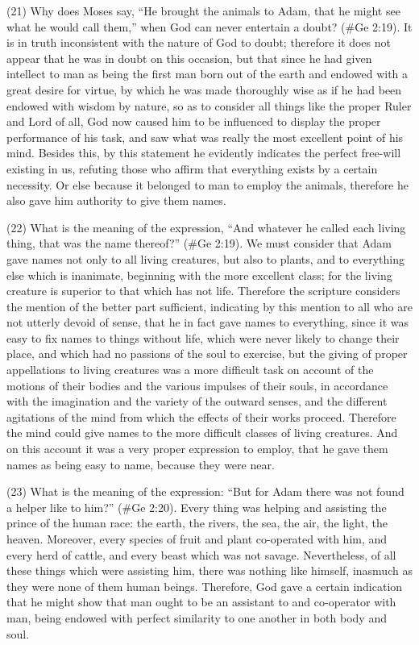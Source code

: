 (21) Why does Moses say, ``He brought the animals to Adam, that he might see what he would call
them,'' when God can never entertain a doubt? (\#Ge 2:19). It is in truth inconsistent with the
nature of God to doubt; therefore it does not appear that he was in doubt on this occasion, but that
since he had given intellect to man as being the first man born out of the earth and endowed with a
great desire for virtue, by which he was made thoroughly wise as if he had been endowed with
wisdom by nature, so as to consider all things like the proper Ruler and Lord of all, God now
caused him to be influenced to display the proper performance of his task, and saw what was really
the most excellent point of his mind. Besides this, by this statement he evidently indicates the
perfect free-will existing in us, refuting those who affirm that everything exists by a certain
necessity. Or else because it belonged to man to employ the animals, therefore he also gave him
authority to give them names.

(22) What is the meaning of the expression, ``And whatever he called each living thing, that was the
name thereof?'' (\#Ge 2:19). We must consider that Adam gave names not only to all living
creatures, but also to plants, and to everything else which is inanimate, beginning with the more
excellent class; for the living creature is superior to that which has not life. Therefore the scripture
considers the mention of the better part sufficient, indicating by this mention to all who are not
utterly devoid of sense, that he in fact gave names to everything, since it was easy to fix names to
things without life, which were never likely to change their place, and which had no passions of the
soul to exercise, but the giving of proper appellations to living creatures was a more difficult task
on account of the motions of their bodies and the various impulses of their souls, in accordance
with the imagination and the variety of the outward senses, and the different agitations of the mind
from which the effects of their works proceed. Therefore the mind could give names to the more
difficult classes of living creatures. And on this account it was a very proper expression to employ,
that he gave them names as being easy to name, because they were near.

(23) What is the meaning of the expression: ``But for Adam there was not found a helper like to
him?'' (\#Ge 2:20). Every thing was helping and assisting the prince of the human race: the
earth, the rivers, the sea, the air, the light, the heaven. Moreover, every species of fruit and plant
co-operated with him, and every herd of cattle, and every beast which was not savage.
Nevertheless, of all these things which were assisting him, there was nothing like himself,
inasmuch as they were none of them human beings. Therefore, God gave a certain indication that
he might show that man ought to be an assistant to and co-operator with man, being endowed with
perfect similarity to one another in both body and soul.

